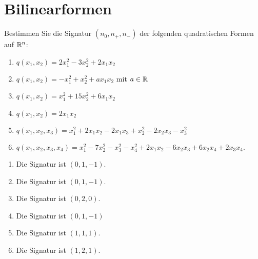 \section{Bilinearformen}







\begin{question}[subtitle = Berechnung der Signatur quadratischer Formen]{1}
  Bestimmen Sie die Signatur $(n_0, n_+, n_-)$ der folgenden quadratischen Formen auf $\mathbb{R}^n$:
  \begin{enumerate}[leftmargin=*]
    \item
      $
          q(x_1, x_2)
        = 2 x_1^2 - 3 x_2^2 + 2 x_1 x_2
      $
    \item
      $
          q(x_1, x_2)
        = - x_1^2 + x_2^2 + a x_1 x_2
      $
      mit $a \in \mathbb{R}$
    \item
      $
          q(x_1, x_2)
        = x_1^2 + 15 x_2^2 + 6 x_1 x_2
      $
    \item
      $
          q(x_1, x_2)
        = 2 x_1 x_2
      $
    \item
      $
          q(x_1, x_2, x_3)
        = x_1^2 + 2 x_1 x_2 - 2 x_1 x_3 + x_2^2 - 2 x_2 x_3 - x_3^2
      $
    \item
      $
          q(x_1, x_2, x_3, x_4)
        = x_1^2 - 7 x_2^2 - x_3^2 - x_4^2 + 2 x_1 x_2 - 6 x_2 x_3 + 6 x_2 x_4 + 2 x_3 x_4.
      $
  \end{enumerate}
\end{question}
\begin{solution}
  \begin{enumerate}[leftmargin=*]
    \item
      Die Signatur ist $(0,1,-1)$.
    \item
      Die Signatur ist $(0,1,-1)$.
    \item
      Die Signatur ist $(0,2,0)$.
    \item
      Die Signatur ist $(0,1,-1)$
    \item
      Die Signatur ist $(1,1,1)$.
    \item
      Die Signatur ist $(1,2,1)$.
  \end{enumerate}
\end{solution}


